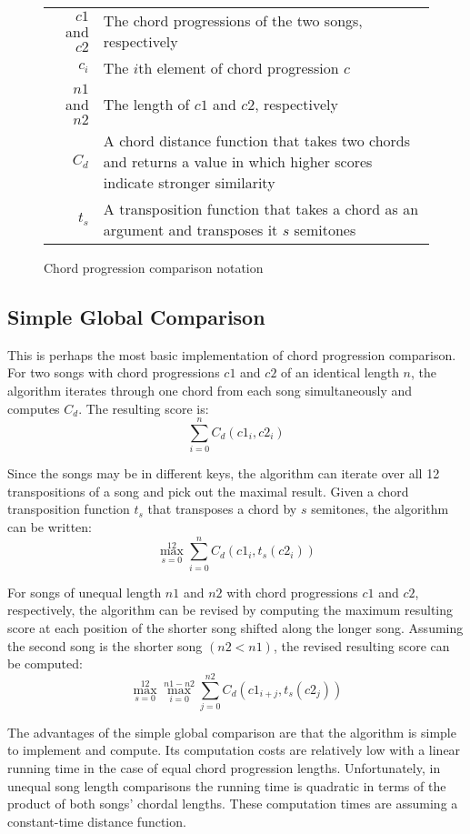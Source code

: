 \begin{figure}[h]
\centering
\begin{tabular}{rl}
${c1}$ and ${c2}$   & The chord progressions of the two songs, respectively \\
$c_i$               & The $i$th element of chord progression $c$ \\
${n1}$ and ${n2}$   & The length of ${c1}$ and ${c2}$, respectively \\
$C_d$               & A chord distance function that takes two chords and returns a value in which higher scores indicate stronger similarity  \\
$t_s$               & A transposition function that takes a chord as an argument and transposes it $s$ semitones \\

\bottomrule
\end{tabular}
\caption{Chord progression comparison notation}
\label{fig:comparenotation}
\end{figure}

\subsection{Simple Global Comparison}

This is perhaps the most basic implementation of chord progression comparison. For two songs with chord progressions ${c1}$ and ${c2}$ of an identical length $n$, the algorithm iterates through one chord from each song simultaneously and computes $C_d$. The resulting score is: \[ \sum_{i=0}^n C_d({c1}_i, c2_i) \]

Since the songs may be in different keys, the algorithm can iterate over all 12 transpositions of a song and pick out the maximal result. Given a chord transposition function $t_s$ that transposes a chord by $s$ semitones, the algorithm can be written: \[ \max_{s=0}^{12} \sum_{i=0}^n C_d({c1}_i, t_s({c2}_i)) \]

For songs of unequal length ${n1}$ and ${n2}$ with chord progressions ${c1}$ and ${c2}$, respectively, the algorithm can be revised by computing the maximum resulting score at each position of the shorter song shifted along the longer song. Assuming the second song is the shorter song $({n2} < {n1})$, the revised resulting score can be computed: \[ \max_{s=0}^{12} \max_{i=0}^{{n1} - {n2}} \sum_{j=0}^{n2} C_d({c1}_{i+j}, t_s({c2}_j)) \]

The advantages of the simple global comparison are that the algorithm is simple to implement and compute. Its computation costs are relatively low with a linear running time in the case of equal chord progression lengths. Unfortunately, in unequal song length comparisons the running time is quadratic in terms of the product of both songs' chordal lengths. These computation times are assuming a constant-time distance function.

